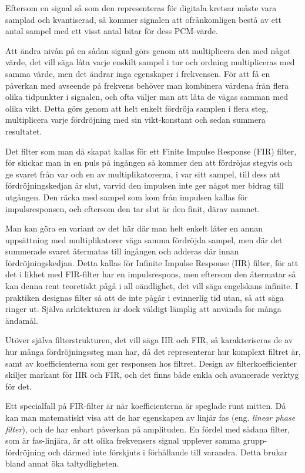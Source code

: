 Eftersom en signal så som den representeras för digitala kretsar måste vara
samplad och kvantiserad, så kommer signalen att ofrånkomligen bestå av ett
antal sampel med ett visst antal bitar för dess PCM-värde.

Att ändra nivån på en sådan signal görs genom att multiplicera den med något
värde, det vill säga låta varje enskilt sampel i tur och ordning multipliceras
med samma värde, men det ändrar inga egenskaper i frekvensen.
För att få en påverkan med avseende på frekvens behöver man kombinera värdena
från flera olika tidpunkter i signalen, och ofta väljer man att låta de
vägas samman med olika vikt.
Detta görs genom att helt enkelt fördröja samplen i flera steg,
multiplicera varje fördröjning med sin vikt-konstant och sedan summera
resultatet.

Det filter som man då skapat kallas för ett Finite Impulse Response (FIR)
filter, för skickar man in en puls på ingången så kommer den att fördröjas
stegvis och ge svaret från var och en av multiplikatorerna, i var sitt sampel,
till dess att fördröjningskedjan är slut, varvid den impulsen inte ger något
mer bidrag till utgången.
Den räcka med sampel som kom från impulsen kallas för impulsresponsen, och
eftersom den tar slut är den finit, därav namnet.

Man kan göra en variant av det här där man helt enkelt låter en annan
uppsättning med multiplikatorer väga samma fördröjda sampel, men där det
summerade svaret återmatas till ingången och adderas där innan
fördröjningskedjan.
Detta kallas för Infinite Impulse Response (IIR) filter, för att det i likhet
med FIR-filter har en impulsrespons, men eftersom den återmatar så kan denna
rent teoretiskt pågå i all oändlighet, det vill säga engelskans infinite.
I praktiken designas filter så att de inte pågår i evinnerlig tid utan, så att
säga ringer ut.
Själva arkitekturen är dock väldigt lämplig att använda för många ändamål.

Utöver själva filterstrukturen, det vill säga IIR och FIR, så karakteriseras de
av hur många fördröjningssteg man har, då det representerar hur komplext
filtret är, samt av koefficienterna som ger responsen hos filtret.
Design av filterkoefficienter skiljer markant för IIR och FIR, och det finns
både enkla och avancerade verktyg för det.

Ett specialfall på FIR-filter är när koefficienterna är speglade runt mitten.
Då kan man matematiskt visa att de har egenskapen av linjär fas (eng.
\emph{linear phase filter}), och de har enbart påverkan på amplituden.
En fördel med sådana filter, som är fas-linjära, är att olika frekvensers
signal upplever samma grupp-fördröjning och därmed inte förskjuts i förhållande
till varandra.
Detta brukar bland annat öka taltydligheten.

